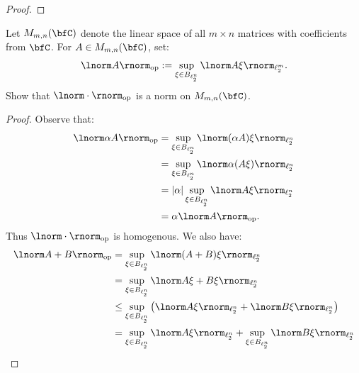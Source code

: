 \documentclass[11pt,twoside,openany]{memoir}
\begin{document}
\begin{proof}
        \end{proof}
    \begin{exercise}
        Let $M_{m,n}(\bfC)$ denote the linear space of all $m \times n$ matrices with coefficients from $\bfC$. For $A \in M_{m,n}(\bfC)$, set:
            \begin{equation*}
            \begin{split}
                \lnorm A \rnorm_\text{op} := \sup_{\xi \in B_{\ell_2^n}}\lnorm A \xi \rnorm_{\ell_2^m}.
            \end{split}
            \end{equation*}
        Show that $\lnorm \cdot \rnorm_\text{op}$ is a norm on $M_{m,n}(\bfC)$.
    \end{exercise}
        \begin{proof}
            Observe that:
                \begin{equation*}
                \begin{split}
                    \lnorm \alpha A \rnorm_\text{op}
                    & = \sup_{\xi \in B_{\ell_2^n}}\lnorm (\alpha A)\xi \rnorm_{\ell_2^n} \\
                    & = \sup_{\xi \in B_{\ell_2^n}} \lnorm \alpha (A \xi) \rnorm_{\ell_2^n} \\
                    & = |\alpha| \sup_{\xi \in B_{\ell_2^n}}\lnorm A \xi \rnorm_{\ell_2^n} \\
                    & = \alpha \lnorm A \rnorm_\text{op}.
                \end{split}
                \end{equation*}
            Thus $\lnorm \cdot \rnorm_\text{op}$ is homogenous. We also have:
                \begin{equation*}
                \begin{split}
                    \lnorm A + B \rnorm_\text{op}
                    & = \sup_{\xi \in B_{\ell_2^n}}\lnorm (A + B)\xi \rnorm_{\ell_2^n} \\
                    & = \sup_{\xi \in B_{\ell_2^n}}\lnorm A\xi + B\xi \rnorm_{\ell_2^n} \\
                    & \leq \sup_{\xi \in B_{\ell_2^n}} \left( \lnorm  A \xi\rnorm_{\ell_2^n} + \lnorm B\xi \rnorm_{\ell_2^n} \right) \\
                    & = \sup_{\xi \in B_{\ell_2^n}}\lnorm A\xi \rnorm_{\ell_2^n} + \sup_{\xi \in B_{\ell_2^n}}\lnorm B \xi\rnorm_{\ell_2^n} \\

\end{split}
\end{equation*}
\end{proof}
\end{document}
